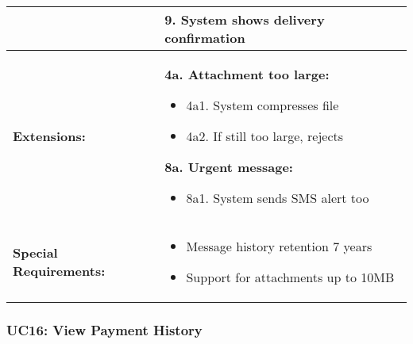 \documentclass[12pt]{article}
\begin{document}
\begin{longtable}{|p{3cm}|p{11cm}|}
& 9. System shows delivery confirmation \\
\hline
\textbf{Extensions:} & 
\textbf{4a. Attachment too large:}
\begin{itemize}
    \item 4a1. System compresses file
    \item 4a2. If still too large, rejects
\end{itemize}
\textbf{8a. Urgent message:}
\begin{itemize}
    \item 8a1. System sends SMS alert too
\end{itemize} \\
\hline
\textbf{Special Requirements:} & 
\begin{itemize}
    \item Message history retention 7 years
    \item Support for attachments up to 10MB
\end{itemize} \\
\hline
\end{longtable}

\subsubsection{UC16: View Payment History}
\end{document}
